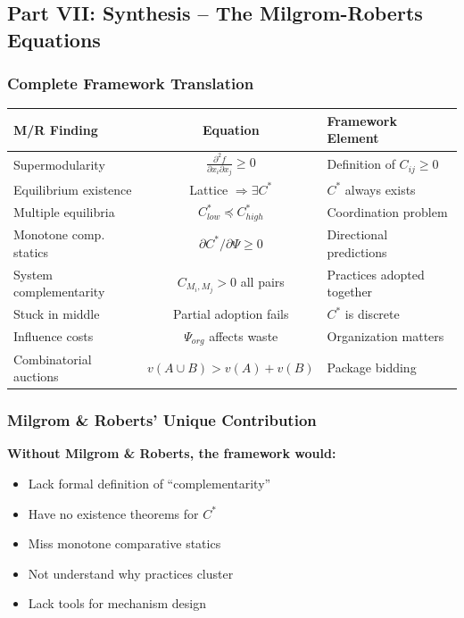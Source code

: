 \subsection{Part VII: Synthesis – The Milgrom-Roberts Equations}

\subsubsection{Complete Framework Translation}

\begin{center}
\renewcommand{\arraystretch}{1.5}
\begin{tabular}{|l|c|l|}
\hline
\textbf{M/R Finding} & \textbf{Equation} & \textbf{Framework Element} \\
\hline
Supermodularity & $\frac{\partial^2 f}{\partial x_i \partial x_j} \geq 0$ & Definition of $C_{ij} \geq 0$ \\
\hline
Equilibrium existence & Lattice $\Rightarrow \exists C^*$ & $C^*$ always exists \\
\hline
Multiple equilibria & $C^*_{low} \preceq C^*_{high}$ & Coordination problem \\
\hline
Monotone comp. statics & $\partial C^* / \partial \Psi \geq 0$ & Directional predictions \\
\hline
System complementarity & $C_{M_i, M_j} > 0$ all pairs & Practices adopted together \\
\hline
Stuck in middle & Partial adoption fails & $C^*$ is discrete \\
\hline
Influence costs & $\Psi_{org}$ affects waste & Organization matters \\
\hline
Combinatorial auctions & $v(A \cup B) > v(A) + v(B)$ & Package bidding \\
\hline
\end{tabular}
\end{center}

\subsubsection{Milgrom \& Roberts' Unique Contribution}

\textbf{Without Milgrom \& Roberts, the framework would:}
\begin{itemize}
    \item Lack formal definition of ``complementarity''
    \item Have no existence theorems for $C^*$
    \item Miss monotone comparative statics
    \item Not understand why practices cluster
    \item Lack tools for mechanism design
\end{itemize}

